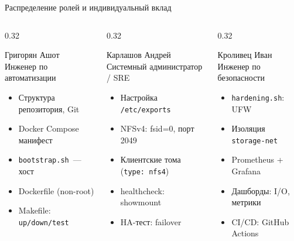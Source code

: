 \documentclass[aspectratio=169,14pt]{beamer}
\begin{document}
	\begin{frame}{Распределение ролей и индивидуальный вклад}
		\small
		\begin{columns}[T]
			\begin{column}{0.32\textwidth}
				\begin{block}{Григорян Ашот\\{\footnotesize Инженер по автоматизации}}
					\begin{itemize}\footnotesize
						\item Структура репозитория, Git
						\item Docker Compose манифест
						\item \texttt{bootstrap.sh}~— хост
						\item Dockerfile (non-root)
						\item Makefile: \texttt{up/down/test}
					\end{itemize}
				\end{block}
			\end{column}
			\begin{column}{0.32\textwidth}
				\begin{block}{Карлашов Андрей\\{\footnotesize Системный администратор / SRE}}
					\begin{itemize}\footnotesize
						\item Настройка \texttt{/etc/exports}
						\item NFSv4: fsid=0, порт 2049
						\item Клиентские тома (\texttt{type: nfs4})
						\item healthcheck: showmount
						\item HA-тест: failover
					\end{itemize}
				\end{block}
			\end{column}
			\begin{column}{0.32\textwidth}
				\begin{block}{Кроливец Иван\\{\footnotesize Инженер по безопасности}}
					\begin{itemize}\footnotesize
						\item \texttt{hardening.sh}: UFW
						\item Изоляция \texttt{storage-net}
						\item Prometheus + Grafana
						\item Дашборды: I/O, метрики
						\item CI/CD: GitHub Actions
					\end{itemize}
				\end{block}
			\end{column}
		\end{columns}
	\end{frame}
	
\end{document}

